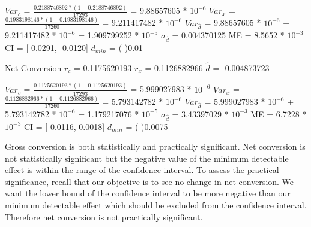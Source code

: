 \documentclass[paper=a4, fontsize=11pt]{scrartcl} %
\numberwithin{equation}{section} %
\numberwithin{figure}{section} %
\numberwithin{table}{section} %
\begin{document}
$Var_{c}$ = $\frac{0.2188746892 * (1 - 0.2188746892)}{17293}$ = 9.88657605 * $10^{-6}$
\newline
$Var_{x}$ = $\frac{0.1983198146 * (1 - 0.1983198146)}{17260}$ = 9.211417482 * $10^{-6}$
\newline
$Var_{\widehat{d}}$ = 9.88657605 * $10^{-6}$ + 9.211417482 * $10^{-6}$ = 1.909799252 * $10^{-5}$
\newline
\newline
$\sigma_{\widehat{d}}$ = 0.004370125
\newline
ME = 8.5652 * $10^{-3}$
\newline
CI = [-0.0291, -0.0120]
\newline
$d_{min}$ = (-)0.01
\newline
\newline


\underline{Net Conversion} \newline
\newline
$r_{c}$ = 0.1175620193
\newline
$r_{x}$ = 0.1126882966
\newline
$\widehat{d}$ = -0.004873723
\newline

$Var_{c}$ = $\frac{0.1175620193 * (1 - 0.1175620193)}{17293}$ = 5.999027983 * $10^{-6}$
\newline
$Var_{x}$ = $\frac{0.1126882966 * (1 - 0.1126882966)}{17260}$ =  5.793142782 * $10^{-6}$
\newline
$Var_{\widehat{d}}$ = 5.999027983 * $10^{-6}$ + 5.793142782 * $10^{-6}$ = 1.179217076 * $10^{-5}$
\newline
\newline
$\sigma_{\widehat{d}}$ = 3.43397029 * $10^{-3}$
\newline
ME = 6.7228 * $10^{-3}$
\newline
CI = [-0.0116, 0.0018]
\newline
$d_{min}$ = (-)0.0075
\newline

Gross conversion is both statistically and practically significant.  Net conversion is not statistically significant but the negative value of the minimum detectable effect is within the range of the confidence interval.  To assess the practical significance, recall that our objective is to see no change in net conversion.  We want the lower bound of the confidence interval to be more negative than our minimum detectable effect which should be excluded from the confidence interval. Therefore net conversion is not practically significant. \newline
\end{document}
